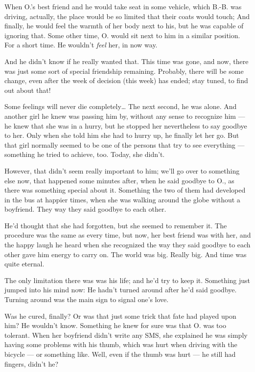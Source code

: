 When O.'s best friend and he would take seat in some vehicle, which B.-B. was driving, actually, the place would be so limited that their coats would touch; And finally, he would feel the warmth of her body next to his, but he was capable of ignoring that. 
Some other time, O. would sit next to him in a similar position.
For a short time.
He wouldn't \emph{feel} her, in now way.

And he didn't know if he really wanted that. 
This time was gone, and now, there was just some sort of special friendship remaining. 
Probably, there will be some change, even after the week of decision (this week) has ended; stay tuned, to find out about that!

Some feelings will never die completely\dots{}
The next second, he was alone. 
And another girl he knew was passing him by, without any sense to recognize him --- he knew that she was in a hurry, but he stopped her nevertheless to say goodbye to her. 
Only when she told him she had to hurry up, he finally let her go. 
But that girl normally seemed to be one of the persons that try to see everything --- something he tried to achieve, too. 
Today, she didn't.

However, that didn't seem really important to him; we'll go over to something else now, that happened some minutes after, when he said goodbye to O., as there was something special about it. 
Something the two of them had developed in the bus at happier times, when she was walking around the globe without a boyfriend. 
They way they said goodbye to each other.

He'd thought that she had forgotten, but she seemed to remember it. 
The procedure was the same as every time, but now, her best friend was with her, and the happy laugh he heard when she recognized the way they said goodbye to each other gave him energy to carry on. 
The world was big. 
Really big. 
And time was quite eternal.

The only limitation there was was his life; and he'd try to keep it. 
Something just jumped into his mind now: He hadn't turned around after he'd said goodbye.
Turning around was the main sign to signal one's love. 

Was he cured, finally?
Or was that just some trick that fate had played upon him?
He wouldn't know. 
Something he knew for sure was that O. was too tolerant. 
When her boyfriend didn't write any SMS, she explained he was simply having some problems with his thumb, which was hurt when driving with the bicycle --- or something like. 
Well, even if the thumb was hurt --- he still had fingers, didn't he?

